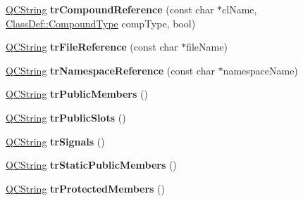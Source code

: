 \begin{DoxyCompactItemize}
\item 
\mbox{\label{class_translator_croatian_a321d4b92d22bb583e8ff1c5ac468896c}} 
\mbox{\hyperlink{class_q_c_string}{Q\+C\+String}} {\bfseries tr\+Compound\+Reference} (const char $\ast$cl\+Name, \mbox{\hyperlink{class_class_def_ae70cf86d35fe954a94c566fbcfc87939}{Class\+Def\+::\+Compound\+Type}} comp\+Type, bool)
\item 
\mbox{\label{class_translator_croatian_a53621d36c131a29c03ab5c162dca1735}} 
\mbox{\hyperlink{class_q_c_string}{Q\+C\+String}} {\bfseries tr\+File\+Reference} (const char $\ast$file\+Name)
\item 
\mbox{\label{class_translator_croatian_a045170e05b41f0d05ebb1ca532df44fa}} 
\mbox{\hyperlink{class_q_c_string}{Q\+C\+String}} {\bfseries tr\+Namespace\+Reference} (const char $\ast$namespace\+Name)
\item 
\mbox{\label{class_translator_croatian_a63d660f99f7439218f0100fcf0c2580a}} 
\mbox{\hyperlink{class_q_c_string}{Q\+C\+String}} {\bfseries tr\+Public\+Members} ()
\item 
\mbox{\label{class_translator_croatian_aabe5bfba520e49cc4677a1c204b3c746}} 
\mbox{\hyperlink{class_q_c_string}{Q\+C\+String}} {\bfseries tr\+Public\+Slots} ()
\item 
\mbox{\label{class_translator_croatian_a9a45e4a6cd593c10570d78dd1441a4c3}} 
\mbox{\hyperlink{class_q_c_string}{Q\+C\+String}} {\bfseries tr\+Signals} ()
\item 
\mbox{\label{class_translator_croatian_af3fec0b58d6b1a9ccf48e2d8d80a44ed}} 
\mbox{\hyperlink{class_q_c_string}{Q\+C\+String}} {\bfseries tr\+Static\+Public\+Members} ()
\item 
\mbox{\label{class_translator_croatian_a854a181b93416af8dc079901ab6fad19}} 
\mbox{\hyperlink{class_q_c_string}{Q\+C\+String}} {\bfseries tr\+Protected\+Members} ()
\item 
\mbox{\label{class_translator_croatian_abfa538438928463231a23a54b4e0e1a3}} 

\end{DoxyCompactItemize}

